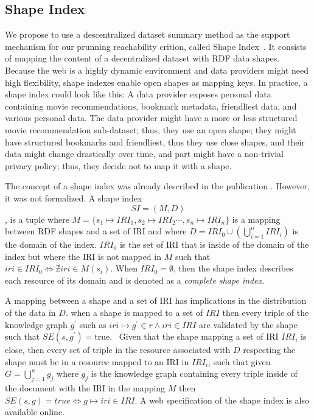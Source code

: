 \subsection{Shape Index}
We propose to use a descentralized dataset summary method as the support mechanism for our prunning reachability crition, called Shape Index~\cite{tam2024opportunitiesshapebasedoptimizationlink}.
It consists of mapping the content of a decentralized dataset with RDF data shapes.
Because the web is a highly dynamic environment and data providers might need high flexibility, shape indexes enable open shapes as mapping keys.
In practice, a shape index could look like this: A data provider exposes personal data containing movie recommendations, bookmark metadata, friendliest data, and various personal data.
The data provider might have a more or less structured movie recommendation sub-dataset; thus, they use an open shape; they might have structured bookmarks and friendliest, thus they 
use close shapes, and their data might change drastically over time, and part might have a non-trivial privacy policy; thus, they decide not to map it with a shape.

The concept of a shape index was already described in the publication . 
However, it was not formalized.
A shape index 
\begin{equation}\label{eq:shapeIndex}
   SI = (M, D)
\end{equation}
, is a tuple where $M = \{s_1 \mapsto IRI_1, s_2 \mapsto IRI_2 \cdots, s_n \mapsto IRI_n\}$ is a mapping between RDF shapes and a set of IRI 
and where $D = IRI_0 \cup (\bigcup\limits_{i=1}^{n} IRI_i)$ is the domain of the index.
$IRI_0$ is the set of IRI that is inside of the domain of the index but where the IRI is not mapped in $M$
such that $iri \in IRI_0 \iff \nexists iri \in M(s_i)$.
When $IRI_0 = \emptyset$, then the shape index describes each resource of its domain and is denoted as a \emph{complete shape index}. 

A mapping between a shape and a set of IRI has implications in the distribution of the data in $D$.
when a shape is mapped to a set of $IRI$ then every triple of the knowledge graph $g^{\prime}$ such as $iri \mapsto g^{\prime} \in r \land iri \in IRI$
are validated by the shape such that $SE(s, g^{\prime}) = \text{true}$.~
Given that the shape mapping a set of IRI $IRI_i$ is close, then every set of triple in the resource associated with $D$ respecting the shape must be in a resource mapped to an IRI in $IRI_i$, 
such that given $G = \bigcup\limits_{j=1}^{n} g_j$ where $g_j$ is the knowledge graph containing every triple inside of the document with the IRI in the mapping $M$
then $SE(s, g) = true \iff g \mapsto iri \in IRI$.
A web specification of the shape index is also available online.~

